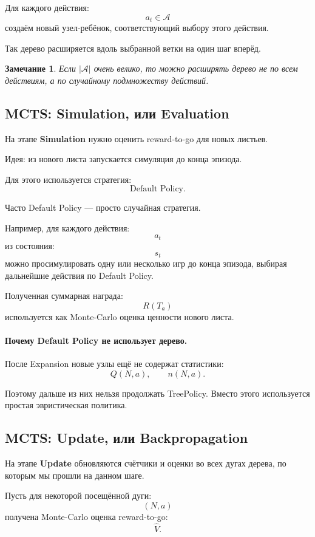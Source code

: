 \documentclass[12pt,a4paper]{article}
\newtheorem{remark}{Замечание}
\begin{document}
Для каждого действия:
\[
a_t\in\mathcal A
\]
создаём новый узел-ребёнок, соответствующий выбору этого действия.

Так дерево расширяется вдоль выбранной ветки на один шаг вперёд.

\begin{remark}
Если $|\mathcal A|$ очень велико, то можно расширять дерево не по всем действиям, а по случайному подмножеству действий.
\end{remark}

\subsection{MCTS: Simulation, или Evaluation}

На этапе \textbf{Simulation} нужно оценить reward-to-go для новых листьев.

Идея: из нового листа запускается симуляция до конца эпизода.

Для этого используется стратегия:
\[
\text{Default Policy}.
\]

Часто Default Policy --- просто случайная стратегия.

Например, для каждого действия:
\[
a_t
\]
из состояния:
\[
s_t
\]
можно просимулировать одну или несколько игр до конца эпизода, выбирая дальнейшие действия по Default Policy.

Полученная суммарная награда:
\[
R(T_a)
\]
используется как Monte-Carlo оценка ценности нового листа.

\paragraph{Почему Default Policy не использует дерево.}

После Expansion новые узлы ещё не содержат статистики:
\[
Q(N,a),
\qquad
n(N,a).
\]

Поэтому дальше из них нельзя продолжать TreePolicy. Вместо этого используется простая эвристическая политика.

\subsection{MCTS: Update, или Backpropagation}

На этапе \textbf{Update} обновляются счётчики и оценки во всех дугах дерева, по которым мы прошли на данном шаге.

Пусть для некоторой посещённой дуги:
\[
(N,a)
\]
получена Monte-Carlo оценка reward-to-go:
\[
\widehat V.
\]
\end{document}

